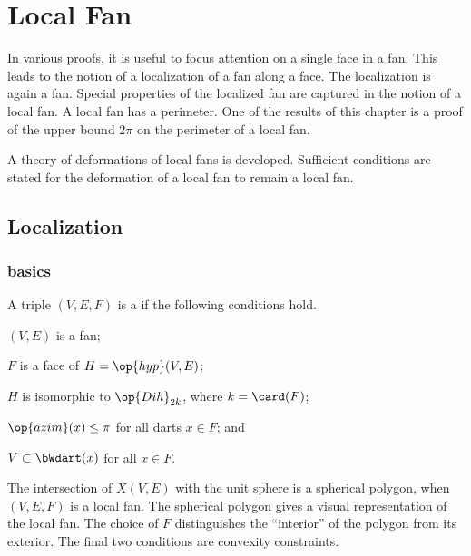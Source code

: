 %
\chapter{Local Fan}\label{sec:local}


\begin{summary}
In various proofs, it is useful to focus attention on a single face
in a fan.  This leads to the notion of a localization of a fan along
a face.  The localization is again a fan.  Special properties of the
localized fan are captured in the notion of a local fan.  A local
fan has a perimeter.  One of the results of this chapter is a proof
of the upper bound $2\pi$ on the perimeter of a local fan.

A theory of deformations of local fans is developed.  Sufficient
conditions are stated for the deformation of a local fan to remain
a local fan.
\end{summary}


\section{Localization}


\subsection{basics}


\begin{definition} 
A triple $(V,E,F)$ is a  if the following conditions hold.
\begin{description} 
\item {} $(V,E)$ is a fan;
\item {} $F$ is a face of $H = \op{hyp}(V,E)$;
\item {} $H$ is isomorphic to $\op{Dih}_{2k}$, where $k =
\card(F)$;
\item {} $\op{azim}(x)\le \pi$ for all darts $x\in F$; and
\item {} $V\subset \bWdart(x)$ for all $x\in F$.
\end{description}
\end{definition}
%

\begin{remark}[visualization]
The intersection of $X(V,E)$ with the unit sphere is a spherical
polygon, when $(V,E,F)$ is a local fan.  The spherical polygon gives
a visual representation of the local fan. The choice of $F$
distinguishes the ``interior'' of the polygon from its exterior.  The
final two conditions are convexity constraints.
\end{remark}

